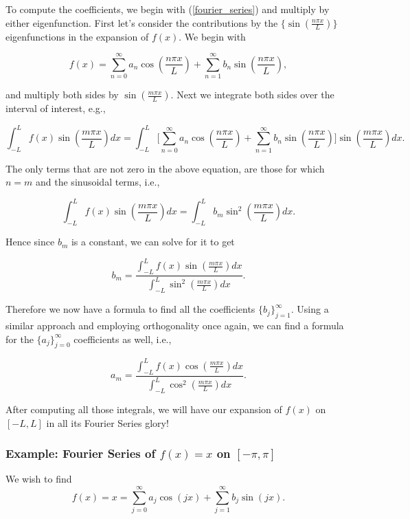 To compute the coefficients, we begin with (\ref{fourier_series}) and multiply by either eigenfunction. First let's consider the contributions by the $\Big\{  \sin\left( \frac{n\pi x}{L} \right ) \Big\}$ eigenfunctions in the expansion of $f(x)$. We begin with

$$f(x) = \sum_{n=0}^{\infty} a_n \cos\left( \frac{n\pi x}{L} \right ) +  \sum_{n=1}^{\infty} b_n \sin\left( \frac{n\pi x}{L} \right ),$$

and multiply both sides by $\sin\left( \frac{m\pi x}{L} \right )$. Next we integrate both sides over the interval of interest, e.g.,

$$\int_{-L}^L f(x) \sin\left( \frac{m\pi x}{L} \right )  dx=\int_{-L}^{L}\Bigg[ \sum_{n=0}^{\infty} a_n \cos\left( \frac{n\pi x}{L} \right ) +  \sum_{n=1}^{\infty} b_n \sin\left( \frac{n\pi x}{L} \right ) \Bigg] \sin\left( \frac{m\pi x}{L} \right ) dx.$$

The only terms that are not zero in the above equation, are those for which $n=m$ and the sinusoidal terms, i.e.,

$$\int_{-L}^L f(x) \sin\left( \frac{m\pi x}{L} \right )  dx = \int_{-L}^{L} b_m \sin^2\left( \frac{m\pi x}{L} \right ) dx.$$

Hence since $b_m$ is a constant, we can solve for it to get

$$b_m = \frac{ \int_{-L}^L f(x) \sin\left( \frac{m\pi x}{L} \right )  dx }{  \int_{-L}^{L} \sin^2\left( \frac{m\pi x}{L} \right ) dx }.$$

Therefore we now have a formula to find all the coefficients $\{b_j\}_{j=1}^{\infty}.$ Using a similar approach and employing orthogonality once again, we can find a formula for the $\{a_j\}_{j=0}^{\infty}$ coefficients as well, i.e., 

$$a_m = \frac{ \int_{-L}^L f(x) \cos\left( \frac{m\pi x}{L} \right )  dx }{  \int_{-L}^{L} \cos^2\left( \frac{m\pi x}{L} \right ) dx }.$$

After computing all those integrals, we will have our expansion of $f(x)$ on $[-L,L]$ in all its Fourier Series glory!


%
%
%
%
\subsubsection{Example: Fourier Series of $f(x)=x$ on $[-\pi,\pi]$}

We wish to find $$f(x) = x = \sum_{j=0}^{\infty} a_j \cos(jx)+  \sum_{j=1}^{\infty} b_j \sin(jx).$$


